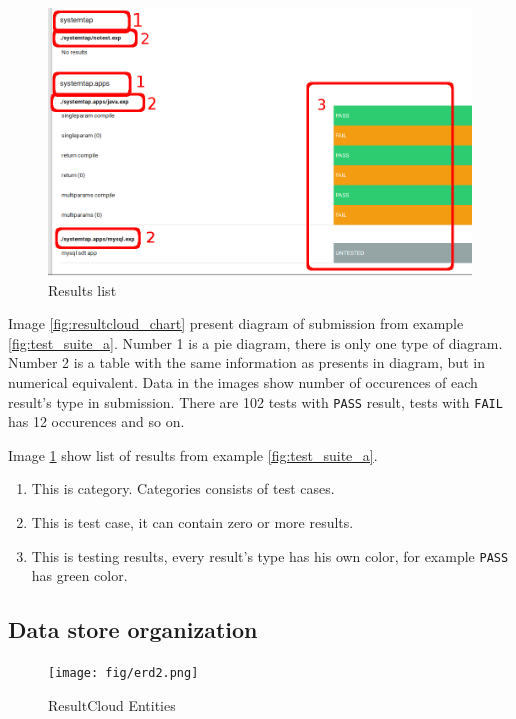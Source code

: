 \begin{figure}[h]
  \centering
    \includegraphics[scale=0.3]{fig/submission_list.png}
  \caption{Results list}
  \label{fig:resultcloud_list}
\end{figure}

Image \ref{fig:resultcloud_chart} present diagram of submission from example \ref{fig:test_suite_a}. Number 1 is a pie diagram, there is only one type of diagram. Number 2 is a table with the same information as presents in diagram, but in numerical equivalent. Data in the images show number of occurences of each result's type in submission. There are 102 tests with \texttt{PASS} result, tests with \texttt{FAIL} has 12 occurences and so on.

Image \ref{fig:resultcloud_list} show list of results from example \ref{fig:test_suite_a}. 

\begin{enumerate}
\item This is category. Categories consists of test cases. 
\item This is test case, it can contain zero or more results.
\item This is testing results, every result's type has his own color, for example \texttt{PASS} has green color. 
\end{enumerate}
\subsection{Data store organization}

\begin{figure}[h]
  \centering
    \texttt{[image: fig/erd2.png]}
  \caption{ResultCloud Entities}
  \label{fig:entities}
\end{figure}

